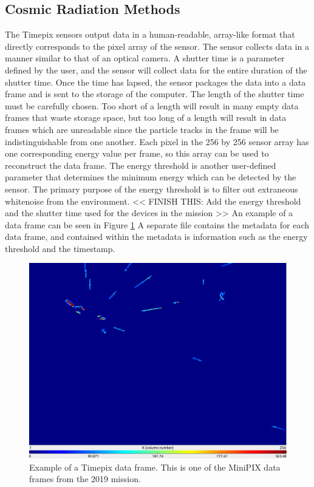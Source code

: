 \subsection{Cosmic Radiation Methods}
\label{sec:Cosmic-Radiation-Methods}

The Timepix sensors output data in a human-readable, array-like format that directly corresponds to the pixel array of the sensor.
The sensor collects data in a manner similar to that of an optical camera.
A shutter time is a parameter defined by the user, and the sensor will collect data for the entire duration of the shutter time.
Once the time has lapsed, the sensor packages the data into a data frame and is sent to the storage of the computer.
The length of the shutter time must be carefully chosen.
Too short of a length will result in many empty data frames that waste storage space, but too long of a length will result in data frames which are unreadable since the particle tracks in the frame will be indistinguishable from one another.
Each pixel in the 256 by 256 sensor array has one corresponding energy value per frame, so this array can be used to reconstruct the data frame.
The energy threshold is another user-defined parameter that determines the minimum energy which can be detected by the sensor.
The primary purpose of the energy threshold is to filter out extraneous whitenoise from the environment.
<< FINISH THIS: Add the energy threshold and the shutter time used for the devices in the mission >>
An example of a data frame can be seen in Figure \ref{fig:minipix-example-frame}
A separate file contains the metadata for each data frame, and contained within the metadata is information such as the energy threshold and the timestamp.

\begin{figure}[h!]
	\begin{center}
		\includegraphics[width=\textwidth]{figures/interesting-frame-3447.png}
		\caption{Example of a Timepix data frame. This is one of the MiniPIX data frames from the 2019 mission.}
		\label{fig:minipix-example-frame}
	\end{center}
\end{figure}


